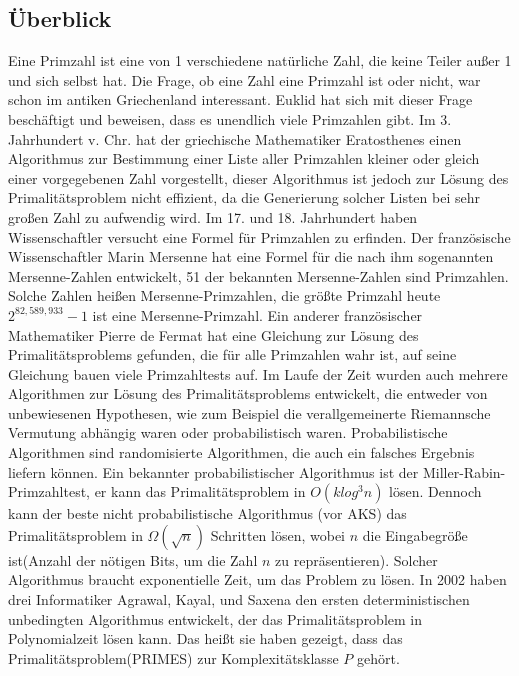 \documentclass[12pt,oneside]{article}
\theoremstyle{remark}
\theoremstyle{definition}
\begin{document}
\subsection{Überblick}
Eine Primzahl ist eine von 1 verschiedene natürliche Zahl, die keine Teiler außer 1 und sich selbst hat. Die Frage, ob eine Zahl eine Primzahl ist oder nicht, war schon im antiken Griechenland interessant. Euklid hat sich mit dieser Frage beschäftigt und beweisen, dass es unendlich viele Primzahlen gibt. Im 3. Jahrhundert v. Chr. hat der griechische Mathematiker Eratosthenes einen Algorithmus zur Bestimmung einer Liste aller Primzahlen kleiner oder gleich einer vorgegebenen Zahl vorgestellt, dieser Algorithmus ist jedoch zur Lösung des Primalitätsproblem nicht effizient, da die Generierung solcher Listen bei sehr großen Zahl zu aufwendig wird. Im 17. und 18. Jahrhundert haben Wissenschaftler versucht eine Formel für Primzahlen zu erfinden. Der französische Wissenschaftler Marin Mersenne hat eine Formel für die nach ihm sogenannten Mersenne-Zahlen entwickelt, 51 der bekannten Mersenne-Zahlen sind Primzahlen. Solche Zahlen heißen Mersenne-Primzahlen, die größte Primzahl heute $2^{82,589,933} − 1$ ist eine Mersenne-Primzahl. Ein anderer französischer Mathematiker Pierre de Fermat hat eine Gleichung zur Lösung des Primalitätsproblems gefunden, die für alle Primzahlen wahr ist, auf seine Gleichung bauen viele Primzahltests auf. \newline\newline
Im Laufe der Zeit wurden auch mehrere Algorithmen zur Lösung des Primalitätsproblems entwickelt, die entweder von unbewiesenen Hypothesen, wie zum Beispiel die verallgemeinerte Riemannsche Vermutung abhängig waren oder probabilistisch waren. Probabilistische Algorithmen sind randomisierte Algorithmen, die auch ein falsches Ergebnis liefern können. Ein bekannter probabilistischer Algorithmus ist der Miller-Rabin-Primzahltest, er kann das Primalitätsproblem in $O(k log^3 n)$ lösen. Dennoch kann der beste nicht probabilistische Algorithmus (vor AKS) das Primalitätsproblem in $ \Omega(\sqrt{n}) $ Schritten lösen, wobei $n$ die Eingabegröße ist(Anzahl der nötigen Bits, um die Zahl $n$ zu repräsentieren). Solcher Algorithmus braucht exponentielle Zeit, um das Problem zu lösen. In 2002 haben drei Informatiker Agrawal, Kayal, und Saxena den ersten deterministischen unbedingten Algorithmus entwickelt, der das Primalitätsproblem in Polynomialzeit lösen kann. Das heißt sie haben gezeigt, dass das Primalitätsproblem(PRIMES) zur Komplexitätsklasse $P$ gehört.      
\end{document}
